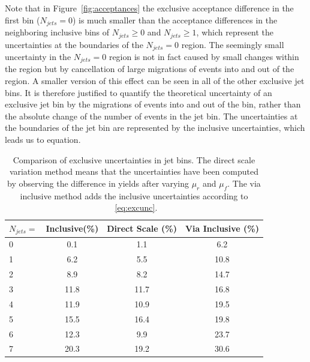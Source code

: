 \documentclass[oneside, letterpaper, oldfontcommands]{memoir}
\begin{document}
\qquad Note that in Figure~\ref{fig:acceptances} the exclusive acceptance difference in the first bin ($N_{jets}=0$) is much smaller than the acceptance differences in the neighboring inclusive bins of $N_{jets} \geq 0$ and $N_{jets} \geq 1$, which represent the uncertainties at the boundaries of the $N_{jets}=0$ region. The seemingly small uncertainty in the $N_{jets}=0$ region is not in fact caused by small changes within the region but by cancellation of large migrations of events into and out of the region. A smaller version of this effect can be seen in all of the other exclusive jet bins.
It is therefore justified to quantify the theoretical uncertainty of an exclusive jet bin by the migrations of events into and out of the bin, rather than the absolute change of the number of events in the jet bin. The uncertainties at the boundaries of the jet bin are represented by the inclusive uncertainties, which leads us to equation.



\begin{table}[hbtp]
 \centering  
 \caption{Comparison of exclusive uncertainties in jet bins. The direct scale variation method means that the uncertainties have been computed by observing the difference in yields after varying $\mu_{r}$ and $\mu_{f}$. The via inclusive method adds the inclusive uncertainties according to ~\ref{eq:excunc}.}
  \label{tab:JetUncTable}
   
  \begin{tabular}{l|c|c|c} \hline
    $N_{jets} =$       &Inclusive(\%)   &  Direct Scale (\%)    & Via Inclusive (\%) \\ \hline
    0                  & 0.1   & 1.1  & 6.2 \\
    1                  & 6.2   & 5.5  & 10.8\\
    2                  & 8.9   & 8.2  & 14.7\\
    3                  & 11.8  & 11.7 & 16.8\\
    4                  & 11.9  & 10.9 & 19.5\\
    5                  & 15.5  & 16.4 & 19.8\\
    6                  & 12.3  & 9.9  & 23.7\\
    7                  & 20.3  & 19.2 & 30.6\\
  \hline
  \end{tabular}
  
\end{table}
\end{document}

